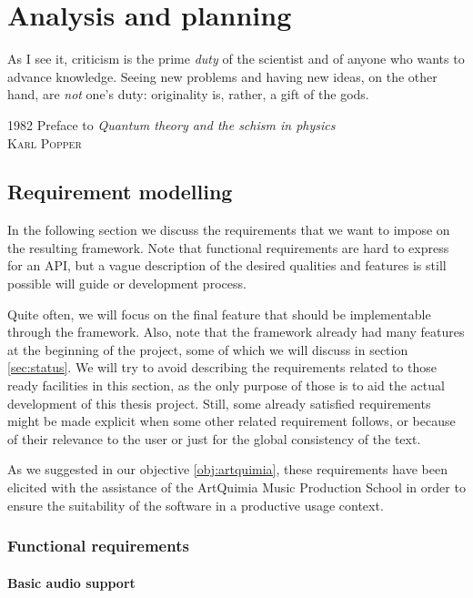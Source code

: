 
\chapter{Analysis and planning}

\epigraph{As I see it, criticism is the prime \emph{duty} of the
  scientist and of anyone who wants to advance knowledge. Seeing new
  problems and having new ideas, on the other hand, are \emph{not}
  one's duty: originality is, rather, a gift of the gods.}{
  1982 Preface to \emph{Quantum theory and the schism in physics}\\
  \textsc{Karl Popper}}

\section{Requirement modelling}
\label{sec:requirements}

In the following section we discuss the requirements that we want to
impose on the resulting framework. Note that functional requirements
are hard to express for an API, but a vague description of the desired
qualities and features is still possible will guide or development
process.

Quite often, we will focus on the final feature that should be
implementable through the framework. Also, note that the framework
already had many features at the beginning of the project, some of
which we will discuss in section \ref{sec:status}. We will try to
avoid describing the requirements related to those ready facilities in
this section, as the only purpose of those is to aid the actual
development of this thesis project. Still, some already satisfied
requirements might be made explicit when some other related
requirement follows, or because of their relevance to the user or just
for the global consistency of the text.

As we suggested in our objective \ref{obj:artquimia}, these
requirements have been elicited with the assistance of the ArtQuimia
Music Production School in order to ensure the suitability of the
software in a productive usage context.

\subsection{Functional requirements}

\subsubsection{Basic audio support}


